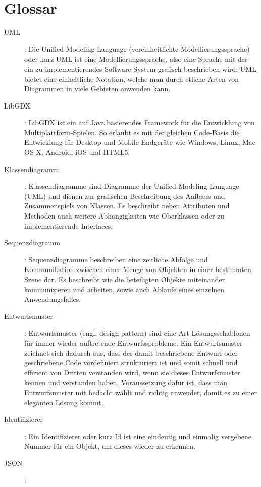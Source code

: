 \section{Glossar}
\begin{description}
\item[UML]:
Die Unified Modeling Language (vereinheitlichte Modellierungssprache) oder kurz UML ist eine Modellierungssprache, also eine Sprache mit der ein zu implementierendes Software-System grafisch beschrieben wird.
UML bietet eine einheitliche Notation, welche man durch etliche Arten von Diagrammen in viele Gebieten anwenden kann.

\item[LibGDX]:
LibGDX ist ein auf Java basierendes Framework für die Entwicklung von Multiplattform-Spielen. So erlaubt es mit der gleichen Code-Basis die Entwicklung für Desktop und Mobile Endgeräte wie Windows, Linux, Mac OS X, Android, iOS und HTML5. 

\item[Klassendiagramm]:
Klassendiagramme sind Diagramme der Unified Modeling Language (UML) und dienen zur grafischen Beschreibung des Aufbaus und Zusammenspiels von Klassen.
Es beschreibt neben Attributen und Methoden auch weitere Abhängigkeiten wie Oberklassen oder zu implementierende Interfaces.

\item[Sequenzdiagramm]:
Sequenzdiagramme beschreiben eine zeitliche Abfolge und Kommunikation zwischen einer Menge von Objekten in einer bestimmten Szene dar. Es beschreibt wie die beteiligten Objekte miteinander kommunizieren und arbeiten, sowie auch Abläufe eines einzelnen Anwendungsfalles.

\item[Entwurfsmuster]: 
Entwurfsmuster (engl. design pattern) sind eine Art Lösungsschablonen für immer wieder auftretende Entwurfssprobleme. Ein Entwurfsmuster zeichnet sich dadurch aus, dass der damit beschriebene Entwurf oder geschriebene Code vordefiniert strukturiert ist und somit schnell und effizient von Dritten verstanden wird, wenn sie dieses Entwurfsmuster kennen und verstanden haben. Voraussetzung dafür ist, dass man Entwurfsmuster mit bedacht wählt und richtig anwendet, damit es zu einer eleganten Lösung kommt.

\item[Identifizierer]: 
Ein Identifizierer oder kurz Id ist eine eindeutig und einmalig vergebene Nummer für ein Objekt, um dieses wieder zu erkennen.

\item[JSON]: 

\end{description}
